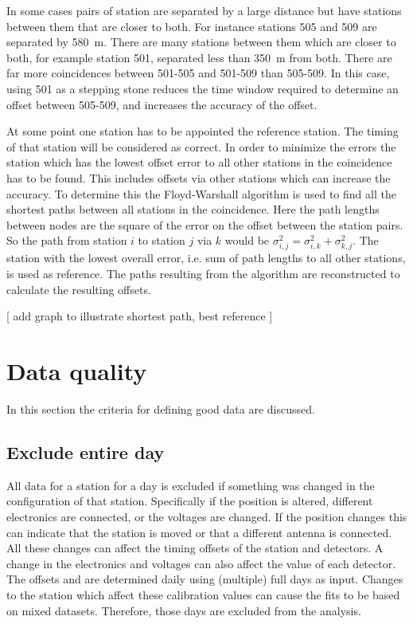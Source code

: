 In some cases pairs of station are separated by a large distance but have stations between them that are closer to both. For instance stations 505 and 509 are separated by \SI{580}{\meter}. There are many stations between them which are closer to both, for example station 501, separated less than \SI{350}{\meter} from both. There are far more coincidences between 501-505 and 501-509 than 505-509. In this case, using 501 as a stepping stone reduces the time window required to determine an offset between 505-509, and increases the accuracy of the offset.

At some point one station has to be appointed the reference station. The timing of that station will be considered as correct. In order to minimize the errors the station which has the lowest offset error to all other stations in the coincidence has to be found. This includes offsets via other stations which can increase the accuracy. To determine this the Floyd-Warshall algorithm \cite{floyd1962algorithm} is used to find all the shortest paths between all stations in the coincidence. Here the path lengths between nodes are the square of the error on the offset between the station pairs. So the path from station $i$ to station $j$ via $k$ would be $\sigma_{i,j}^2 = \sigma_{i,k}^2 + \sigma_{k,j}^2$. The station with the lowest overall error, i.e. sum of path lengths to all other stations, is used as reference. The paths resulting from the algorithm are reconstructed to calculate the resulting offsets.

[ add graph to illustrate shortest path, best reference ]


\section{Data quality}

In this section the criteria for defining good data are discussed.


\subsection{Exclude entire day}

All data for a station for a day is excluded if something was changed in the configuration of that station. Specifically if the \gps position is altered, different electronics are connected, or the \pmt voltages are changed. If the \gps position changes this can indicate that the station is moved or that a different \gps antenna is connected. All these changes can affect the timing offsets of the station and detectors. A change in the electronics and voltages can also affect the \mpv value of each detector. The offsets and \mpv are determined daily using (multiple) full days as input. Changes to the station which affect these calibration values can cause the fits to be based on mixed datasets. Therefore, those days are excluded from the analysis.

